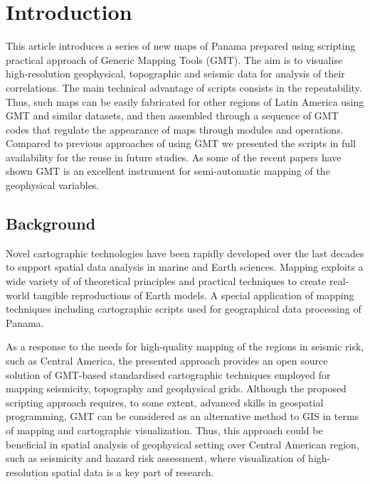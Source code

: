 \documentclass[USenglish,twocolumn]{article}
\begin{document}

\maketitle

\section{Introduction}
This article introduces a series of new maps of Panama prepared using scripting practical approach of Generic Mapping Tools (GMT). The aim is to visualise high-resolution geophysical, topographic and seismic data for analysis of their correlations. The main technical advantage of scripts consists in the repeatability. Thus, such maps can be easily fabricated for other regions of Latin America using GMT and similar datasets, and then assembled through a sequence of GMT codes that regulate the appearance of maps through modules and operations. Compared to previous approaches of using GMT \citep{McNamara,Kobayashi,Cleveland} we presented the scripts in full availability for the reuse in future studies. As some of the recent papers have shown \citep{4814952,Lewis,Zhangetal2017,Eakin} GMT is an excellent instrument for semi-automatic mapping of the geophysical variables.

\subsection{Background}
Novel cartographic technologies have been rapidly developed over the last decades to support spatial data analysis in marine and Earth sciences. Mapping exploits a wide variety of of theoretical principles and practical techniques to create real-world tangible reproductions of Earth models. A special application of mapping techniques including cartographic scripts used for geographical data processing of Panama. 

As a response to the needs for high-quality mapping of the regions in seismic risk, such as Central America, the presented approach provides an open source solution of GMT-based standardised cartographic techniques employed for mapping seismicity, topography and geophysical grids. Although the proposed scripting approach requires, to some extent, advanced skills in geospatial programming, GMT can be considered as an alternative method to GIS in terms of mapping and cartographic visualization. Thus, this approach could be beneficial in spatial analysis of geophysical setting over Central American region, such as seismicity and hazard risk assessment, where visualization of high-resolution spatial data is a key part of research.
\end{document}
